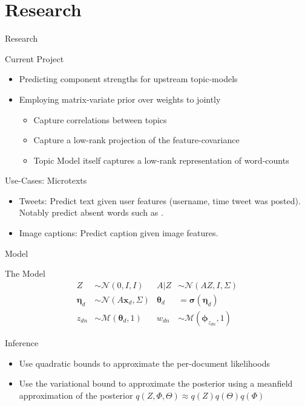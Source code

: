 \documentclass[xcolor=dvipsnames]{beamer}
\newcommand \vv[1] { \boldsymbol #1 }
\newcommand \thd[0]  { { \vv \theta_d } }
\newcommand \xd      { { \vv x_d } }
\newcommand \nor[2]   { \mathcal{N} \left( {#1}, {#2} \right) }
\newcommand \mnor[3]  { \mathcal{N} \left(#1, #2, #3\right) }
\newcommand \muln[2]  { \mathcal{M} \left( {#1},{#2} \right) }
\begin{document}
\section{Research}
\begin{frame}{Research}

Current Project
\begin{itemize}
    \item Predicting component strengths for upstream topic-models
    \item Employing matrix-variate prior over weights to jointly
    \begin{itemize}
        \item Capture correlations between topics
        \item Capture a low-rank projection of the feature-covariance
        \item Topic Model itself captures a low-rank representation of word-counts        
    \end{itemize}
\end{itemize}

Use-Cases: Microtexts
\begin{itemize}
    \item Tweets: Predict text given user features (username, time tweet was posted). Notably predict absent words such as .
    \item Image captions: Predict caption given image features.
\end{itemize}

\end{frame}



\begin{frame}{Model}

The Model
\begin{align}
Z & \sim \mnor{0}{I}{I} & A|Z & \sim \mnor{AZ}{I}{\Sigma} \\
\vv{\eta}_d & \sim \nor{A\xd}{\Sigma} & \thd & = \vv{\sigma}(\vv{\eta}_d) \\
z_{dn} & \sim \muln{\thd}{1} & w_{dn} & \sim \muln{\vv{\phi}_{z_{dn}}}{1} 
\end{align}

Inference
\begin{itemize}
    \item Use quadratic bounds to approximate the per-document likelihoods
    \item Use the variational bound to approximate the posterior using a meanfield approximation of the posterior $q(Z, \Phi, \Theta) \approx q(Z)q(\Theta)q(\Phi)$
\end{itemize}


\end{frame}
\end{document}
